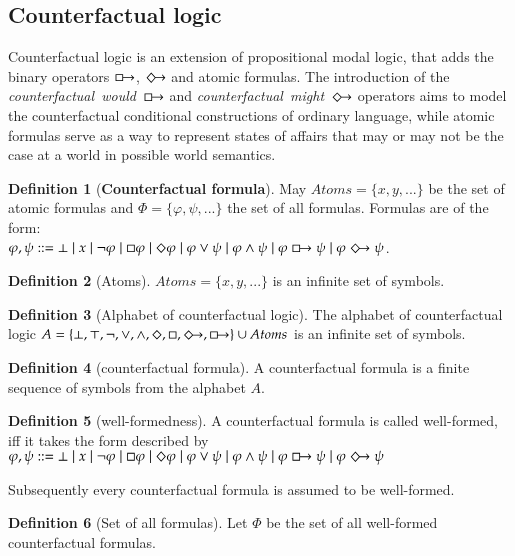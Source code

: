 \documentclass[a4paper,american]{paper}
\theoremstyle{definition}\newtheorem{definition}{Definition}
\begin{document}
\subsection{Counterfactual logic}
Counterfactual logic is an extension of propositional modal logic, that adds the binary operators $\boxright$, $\Diamondright$ and atomic formulas. The introduction of the {\it counterfactual~would}~$\boxright$ and {\it counterfactual~might}~$\Diamondright$ operators \cite{lewis_counterfactuals_1973} aims to model the counterfactual conditional constructions of ordinary language, while atomic formulas serve as a way to represent states of affairs that may or may not be the case at a world in possible world semantics.
\begin{definition}[\textbf{Counterfactual formula}]
\label{pythagorean}
May $Atoms = \{x,y,...\}$ be the set of atomic formulas and $\Phi = \{\varphi, \psi,... \}$ the set of all formulas. Formulas are of the form: \\
$\varphi, \psi ::= \bot \mid x \mid \neg \varphi \mid \Box \varphi \mid \Diamond \varphi \mid \varphi \vee \psi \mid \varphi \wedge \psi \mid \varphi \boxright \psi \mid \varphi \Diamondright \psi$.
\end{definition}
\begin{definition}[Atoms]
$Atoms = \{ x, y, ...\}$ is an infinite set of symbols.
\end{definition}
\begin{definition}[Alphabet of counterfactual logic]
The alphabet of counterfactual logic $A = \{\bot ,\top ,\neg ,\vee ,\wedge ,\Diamond ,\Box ,\Diamondright ,\boxright\}\cup Atoms$ is an infinite set of symbols.
\end{definition}
\begin{definition}[counterfactual formula]
A counterfactual formula is a finite sequence of symbols from the alphabet $A$.
\end{definition}
\begin{definition}[well-formedness]
A counterfactual formula is called well-formed, iff it takes the form described by $\varphi, \psi ::= \bot \mid x \mid \neg \varphi \mid \Box \varphi \mid \Diamond \varphi \mid \varphi \vee \psi \mid \varphi \wedge \psi \mid \varphi \boxright \psi \mid \varphi \Diamondright \psi$
\end{definition}
Subsequently every counterfactual formula is assumed to be well-formed.
\begin{definition}[Set of all formulas]
Let $\Phi$ be the set of all well-formed counterfactual formulas.
\end{definition}


\nocite{*}

\end{document}
